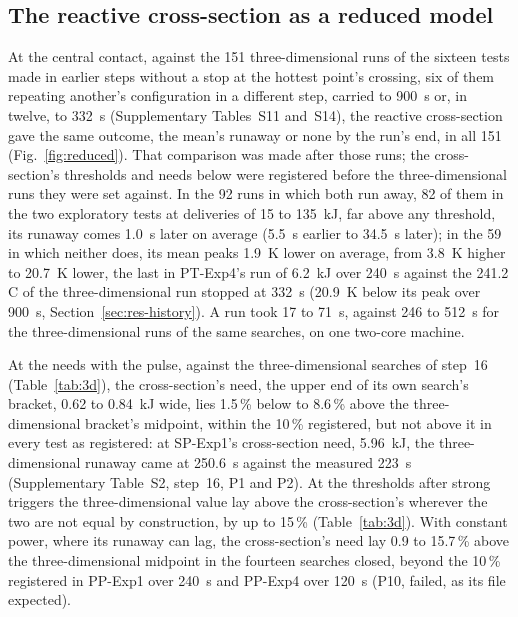 \documentclass[preprint,12pt]{elsarticle}
\newcommand{\degC}{\,\textdegree C}
\begin{document}
\subsection{The reactive cross-section as a reduced model}
\label{sec:res-reduced}

At the central contact, against the 151 three-dimensional runs of the sixteen tests made in earlier steps without a stop at the hottest point's crossing, six of them repeating another's configuration in a different step, carried to 900~s or, in twelve, to 332~s (Supplementary Tables~S11 and~S14), the reactive cross-section gave the same outcome, the mean's runaway or none by the run's end, in all 151 (Fig.~\ref{fig:reduced}). That comparison was made after those runs; the cross-section's thresholds and needs below were registered before the three-dimensional runs they were set against. In the 92 runs in which both run away, 82 of them in the two exploratory tests at deliveries of 15 to 135~kJ, far above any threshold, its runaway comes 1.0~s later on average (5.5~s earlier to 34.5~s later); in the 59 in which neither does, its mean peaks 1.9~K lower on average, from 3.8~K higher to 20.7~K lower, the last in PT-Exp4's run of 6.2~kJ over 240~s against the 241.2\degC{} of the three-dimensional run stopped at 332~s (20.9~K below its peak over 900~s, Section~\ref{sec:res-history}). A run took 17 to 71~s, against 246 to 512~s for the three-dimensional runs of the same searches, on one two-core machine.

At the needs with the pulse, against the three-dimensional searches of step~16 (Table~\ref{tab:3d}), the cross-section's need, the upper end of its own search's bracket, 0.62 to 0.84~kJ wide, lies 1.5\,\% below to 8.6\,\% above the three-dimensional bracket's midpoint, within the 10\,\% registered, but not above it in every test as registered: at SP-Exp1's cross-section need, 5.96~kJ, the three-dimensional runaway came at 250.6~s against the measured 223~s (Supplementary Table~S2, step~16, P1 and P2). At the thresholds after strong triggers the three-dimensional value lay above the cross-section's wherever the two are not equal by construction, by up to 15\,\% (Table~\ref{tab:3d}). With constant power, where its runaway can lag, the cross-section's need lay 0.9 to 15.7\,\% above the three-dimensional midpoint in the fourteen searches closed, beyond the 10\,\% registered in PP-Exp1 over 240~s and PP-Exp4 over 120~s (P10, failed, as its file expected).
\end{document}
